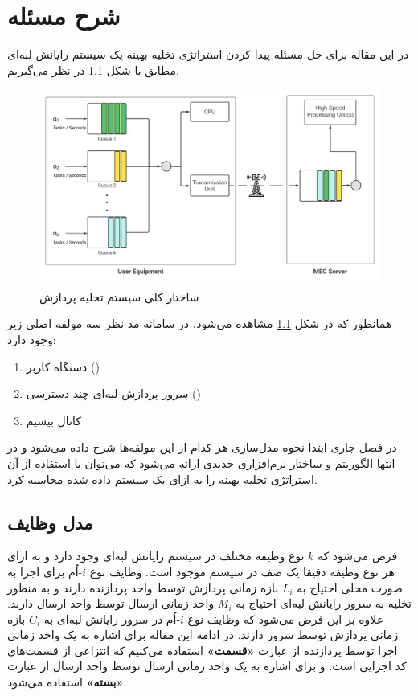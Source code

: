 \chapter{شرح مسئله}
در این مقاله برای حل مسئله پیدا کردن استراتژی تخلیه بهینه یک سیستم رایانش لبه‌ای مطابق با شکل \ref{fig-offloading-system} در نظر می‌گیریم.
\begin{figure}[H]
	\centering
	\includegraphics*[width=\textwidth]{figures/MEC5.png}
	\caption{ساختار کلی سیستم تخلیه پردازش}
	\label{fig-offloading-system}
\end{figure}
\newpage
همانطور که در شکل \ref{fig-offloading-system} مشاهده می‌شود، در سامانه مد نظر سه مولفه اصلی زیر وجود دارد:
\begin{enumerate}
	\item دستگاه کاربر ()
	\item سرور پردازش لبه‌ای چند-دسترسی ()
	\item کانال بیسیم
\end{enumerate}
در فصل جاری ابتدا نحوه مدل‌سازی هر کدام از این مولفه‌ها شرح داده می‌شود و در انتها الگوریتم و ساختار نرم‌افزاری جدیدی ارائه می‌شود که می‌توان با استفاده از آن استراتژی تخلیه بهینه را به ازای یک سیستم داده شده محاسبه کرد.
\section{مدل وظایف}
فرض می‌شود که \(k\) نوع وظیفه مختلف در سیستم رایانش لبه‌ای وجود دارد و به ازای هر نوع وظیفه دقیقا یک صف در سیستم موجود است. وظایف نوع \(i\)-اُم برای اجرا به صورت محلی احتیاج به \(L_i\) بازه زمانی پردازش توسط واحد پردازنده دارند و به منظور تخلیه به سرور رایانش لبه‌ای احتیاج به \(M_i\) واحد زمانی ارسال توسط واحد ارسال دارند. علاوه بر این فرض می‌شود که وظایف نوع \(i\)-اُم در سرور رایانش لبه‌ای به \(C_i\) بازه زمانی پردازش توسط سرور دارند. در ادامه این مقاله برای اشاره به یک واحد زمانی اجرا توسط پردازنده از عبارت \textbf{«قسمت»} استفاده می‌کنیم که انتزاعی از قسمت‌های کد اجرایی است. و برای اشاره به یک واحد زمانی ارسال توسط واحد ارسال از عبارت\textbf{ «بسته» }استفاده می‌شود.
\newpage
